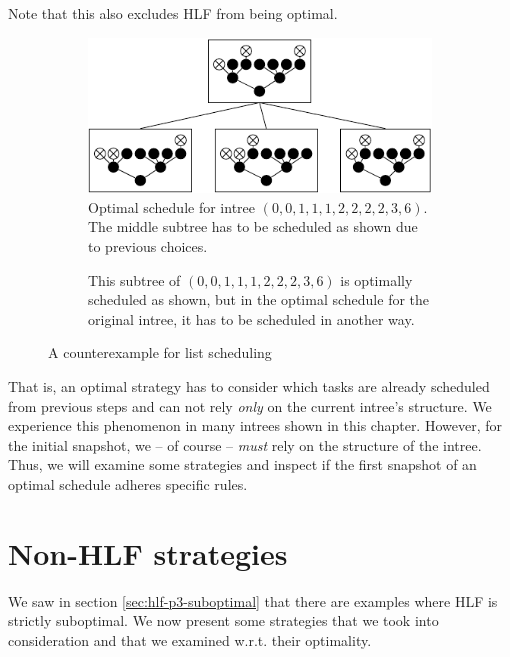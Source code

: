 Note that this also excludes HLF from being optimal.

\begin{figure}[ht]
  \centering
  \begin{subfigure}[b]{.5\textwidth}
    \centering
    \includegraphics{p3/list_sched_0011122236_opt_sched.pdf}
    \caption{Optimal schedule for intree $(0,0,1,1,1,2,2,2,2,3,6)$. The middle subtree has to be scheduled as shown due to previous choices.}
  \end{subfigure}
  \quad
  \begin{subfigure}[b]{.4\textwidth}
    \centering
    \vfill
    
    \vfill
    \caption{This subtree of $(0,0,1,1,1,2,2,2,3,6)$ is optimally scheduled as shown, but in the optimal schedule for the original intree, it has to be scheduled in another way.}
    \label{fig:list-schedule-counter-example-subtree}
  \end{subfigure}
  \caption{A counterexample for list scheduling}
  \label{fig:list-scheduling-counter-example}
\end{figure}

That is, an optimal strategy has to consider which tasks are already scheduled from previous steps and can not rely \emph{only} on the current intree's structure. We experience this phenomenon in many intrees shown in this chapter. However, for the initial snapshot, we -- of course -- \emph{must} rely on the structure of the intree. Thus, we will examine some strategies and inspect if the first snapshot of an optimal schedule adheres specific rules.

\section{Non-HLF strategies}
\label{sec:suboptimal-non-hlf-strategies}

We saw in section \ref{sec:hlf-p3-suboptimal} that there are examples where HLF is strictly suboptimal. We now present some strategies that we took into consideration and that we examined w.r.t. their optimality. 

